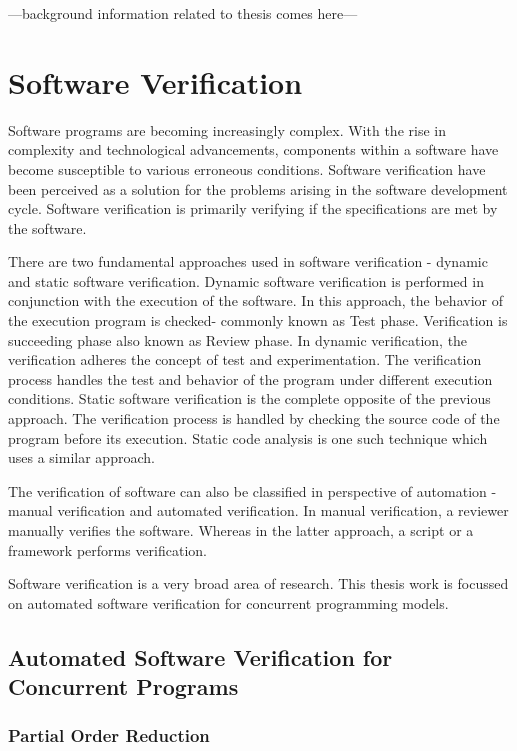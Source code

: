 ---background information related to thesis comes here---
\section{Software Verification}

Software programs are becoming increasingly complex. 
With the rise in complexity and technological advancements, components within a software have become susceptible to various erroneous conditions. 
Software verification have been perceived as a solution for the problems arising in the software development cycle. 
Software verification is primarily verifying if the specifications are met by the software. 

There are two fundamental approaches used in software verification - dynamic and static software verification. 
Dynamic software verification is performed in conjunction with the execution of the software. 
In this approach, the behavior of the execution program is checked- commonly known as Test phase. 
Verification is succeeding phase also known as Review phase. 
In dynamic verification, the verification adheres the concept of test and experimentation. 
The verification process handles the test and behavior of the program under different execution conditions. 
Static software verification is the complete opposite of the previous approach. 
The verification process is handled by checking the source code of the program before its execution. 
Static code analysis is one such technique which uses a similar approach. 

The verification of software can also be classified in perspective of automation - manual verification and automated verification. 
In manual verification, a reviewer manually verifies the software. 
Whereas in the latter approach, a script or a framework performs  verification. 

Software verification is a very broad area of research. 
This thesis work is focussed on automated software verification for concurrent programming models. 

\subsection{Automated Software Verification for Concurrent Programs}



\subsubsection{Partial Order Reduction}
